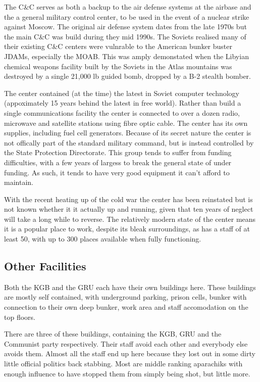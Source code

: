 \documentclass{amsart}
\begin{document}
\begin{multicols}{3}
The C\&C serves as both a backup to the air defense systems at the
airbase and the a general military control center, to be used in the
event of a nuclear strike against Moscow.  The original air defense
system dates from the late 1970s but the main C\&C was build during
they mid 1990s.  The Soviets realised many of their existing C\&C
centers were vulnrable to the American bunker buster JDAMs, especially
the MOAB.  This was amply demonstated when the Libyian chemical
weapons facility built by the Soviets in the Atlas mountains was
destroyed by a single 21,000 lb guided bomb, dropped by a B-2 stealth
bomber.

The center contained (at the time) the latest in Soviet computer
technology (appoximately 15 years behind the latest in free world).
Rather than build a single communications facility the center is
connected to over a dozen radio, microwave and satellite stations
using fibre optic cable.  The center has its own supplies, including
fuel cell generators.  Because of its secret nature the center is
not offically part of the standard military command, but is instead
controlled by the State Protection Directorate.  This group tends
to suffer from funding difficulties, with a few years of largess
to break the general state of under funding.  As such, it tends to
have very good equipment it can't afford to maintain.

With the recent heating up of the cold war the center has been
reinstated but is not known whether it it actually up and running,
given that ten years of neglect will take a long while to reverse.
The relatively modern state of the center means it is a popular place
to work, despite its bleak surroundings, as has a staff of at least
50, with up to 300 places available when fully functioning.

\subsection{Other Facilities}

Both the KGB and the GRU each have their own buildings here.  These
buildings are mostly self contained, with underground parking, prison
cells, bunker with connection to their own deep bunker, work area and
staff accomodation on the top floors.

There are three of these buildings, containing the KGB, GRU and the
Communist party respectively.  Their staff avoid each other and
everybody else avoids them.  Almost all the staff end up here because
they lost out in some dirty little official politics back stabbing.
Most are middle ranking aparachiks with enough influence to have
stopped them from simply being shot, but little more.


\end{multicols}
\end{document}
